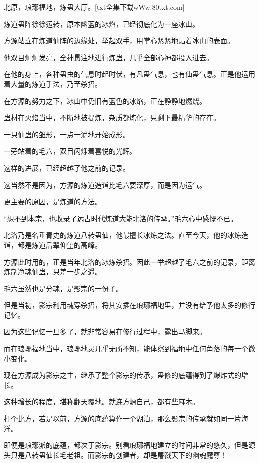 
\begin{this_body}

北原，琅琊福地，炼蛊大厅。[txt全集下载wWw.80txt.com]

炼道蛊阵徐徐运转，原本幽蓝的冰焰，已经彻底化为一座冰山。

方源站立在炼道仙阵的边缘处，举起双手，用掌心紧紧地贴着冰山的表面。

他双目炯炯发亮，全神贯注地进行炼蛊，几乎全部心神都投入进去。

在他的身上，各种蛊虫的气息时起时伏，有凡蛊气息，也有仙蛊气息。正是他运用着大量的炼道手法，乃至杀招。

在方源的努力之下，冰山中仍旧有蓝色的冰焰，正在静静地燃烧。

蛊材在火焰当中，不断地被提炼，杂质都炼化，只剩下最精华的存在。

一只仙蛊的雏形，一点一滴地开始成形。

一旁站着的毛六，双目闪烁着喜悦的光辉。

这样的进展，已经超越了他之前的记录。

这当然不是因为，方源的炼道造诣比毛六要深厚，而是因为运气。

更主要的原因，是炼道的方法。

“想不到本宗，也收录了远古时代炼道大能北洛的传承。”毛六心中感慨不已。

北洛乃是名垂青史的炼道八转蛊仙，他最擅长冰炼之法。直至今天，他的冰炼造诣，都是炼道后辈仰望的高峰。

方源此时用的，正是当年北洛的冰炼杀招。因此一举超越了毛六之前的记录，距离炼制净魂仙蛊，只差一步之遥。

毛六虽然也是分魂，是影宗的一份子。

但是当初，影宗利用魂穿杀招，将其安插在琅琊福地里，并没有给予他太多的修行记忆。

因为这些记忆一旦多了，就非常容易在修行过程中，露出马脚来。

而在琅琊福地当中，琅琊地灵几乎无所不知，能体察到福地中任何角落的每一个微小变化。

现在方源成为影宗之主，继承了整个影宗的传承，蛊修的底蕴得到了爆炸式的增长。

这种增长的程度，堪称翻天覆地。就连方源自己，都有些麻木。

打个比方，若是以前，方源的底蕴算作一个湖泊，那么影宗的传承就如同一片海洋。

即便是琅琊派的底蕴，都次于影宗。别看琅琊福地建立的时间非常的悠久，但是源头只是八转蛊仙长毛老祖。而影宗的创建者，却是屠戮天下的幽魂魔尊！


\end{this_body}
